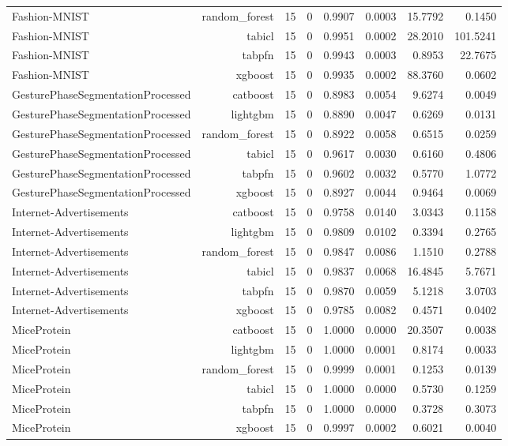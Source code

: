 \begin{table}[htbp]
\begin{tabular}{lrrrrrrr}
Fashion-MNIST & random\_forest & 15 & 0 & 0.9907 & 0.0003 & 15.7792 & 0.1450 \\
Fashion-MNIST & tabicl & 15 & 0 & 0.9951 & 0.0002 & 28.2010 & 101.5241 \\
Fashion-MNIST & tabpfn & 15 & 0 & 0.9943 & 0.0003 & 0.8953 & 22.7675 \\
Fashion-MNIST & xgboost & 15 & 0 & 0.9935 & 0.0002 & 88.3760 & 0.0602 \\
GesturePhaseSegmentationProcessed & catboost & 15 & 0 & 0.8983 & 0.0054 & 9.6274 & 0.0049 \\
GesturePhaseSegmentationProcessed & lightgbm & 15 & 0 & 0.8890 & 0.0047 & 0.6269 & 0.0131 \\
GesturePhaseSegmentationProcessed & random\_forest & 15 & 0 & 0.8922 & 0.0058 & 0.6515 & 0.0259 \\
GesturePhaseSegmentationProcessed & tabicl & 15 & 0 & 0.9617 & 0.0030 & 0.6160 & 0.4806 \\
GesturePhaseSegmentationProcessed & tabpfn & 15 & 0 & 0.9602 & 0.0032 & 0.5770 & 1.0772 \\
GesturePhaseSegmentationProcessed & xgboost & 15 & 0 & 0.8927 & 0.0044 & 0.9464 & 0.0069 \\
Internet-Advertisements & catboost & 15 & 0 & 0.9758 & 0.0140 & 3.0343 & 0.1158 \\
Internet-Advertisements & lightgbm & 15 & 0 & 0.9809 & 0.0102 & 0.3394 & 0.2765 \\
Internet-Advertisements & random\_forest & 15 & 0 & 0.9847 & 0.0086 & 1.1510 & 0.2788 \\
Internet-Advertisements & tabicl & 15 & 0 & 0.9837 & 0.0068 & 16.4845 & 5.7671 \\
Internet-Advertisements & tabpfn & 15 & 0 & 0.9870 & 0.0059 & 5.1218 & 3.0703 \\
Internet-Advertisements & xgboost & 15 & 0 & 0.9785 & 0.0082 & 0.4571 & 0.0402 \\
MiceProtein & catboost & 15 & 0 & 1.0000 & 0.0000 & 20.3507 & 0.0038 \\
MiceProtein & lightgbm & 15 & 0 & 1.0000 & 0.0001 & 0.8174 & 0.0033 \\
MiceProtein & random\_forest & 15 & 0 & 0.9999 & 0.0001 & 0.1253 & 0.0139 \\
MiceProtein & tabicl & 15 & 0 & 1.0000 & 0.0000 & 0.5730 & 0.1259 \\
MiceProtein & tabpfn & 15 & 0 & 1.0000 & 0.0000 & 0.3728 & 0.3073 \\
MiceProtein & xgboost & 15 & 0 & 0.9997 & 0.0002 & 0.6021 & 0.0040 \\

\end{tabular}
\end{table}
